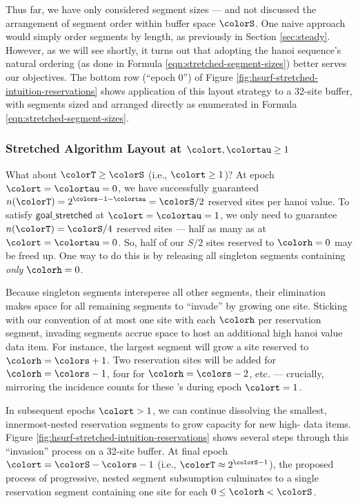 Thus far, we have only considered segment sizes --- and not discussed the arrangement of segment order within buffer space $\colorS$.
One naive approach would simply order segments by length, as previously in Section \ref{sec:steady}.
However, as we will see shortly, it turns out that adopting the hanoi sequence's natural ordering (as done in Formula \ref{eqn:stretched-segment-sizes}) better serves our objectives.
The bottom row (``epoch 0'') of Figure \ref{fig:hsurf-stretched-intuition-reservations} shows application of this layout strategy to a 32-site buffer, with segments sized and arranged directly as enumerated in Formula \ref{eqn:stretched-segment-sizes}.

\subsubsection{Stretched Algorithm Layout at $\colort,\colortau\geq1$}

What about $\colorT \geq \colorS$ (i.e., $\colort \geq 1$)?
At epoch $\colort=\colortau=0$, we have successfully guaranteed $n(\colorT) = 2^{\colors - 1 - \colortau} = \colorS / 2$ reserved sites per hanoi value.
To satisfy $\mathsf{goal\_stretched}$ at $\colort=\colortau=1$, we only need to guarantee $n(\colorT) = \colorS/4$ reserved sites --- half as many as at $\colort=\colortau=0$.
So, half of our $S/2$ sites reserved to \hv{} $\colorh=0$ may be freed up.
One way to do this is by releasing all singleton segments containing \textit{only} \hv{} $\colorh=0$.

Because singleton segments intersperse all other segments, their elimination makes space for all remaining segments to ``invade'' by growing one site.
Sticking with our convention of at most one site with each \hv{} $\colorh$ per reservation segment, invading segments accrue space to host an additional high hanoi value data item.
For instance, the largest segment will grow a site reserved to \hv{} $\colorh=\colors +1$.
Two reservation sites will be added for \hv{} $\colorh=\colors - 1$, four for \hv{} $\colorh=\colors - 2$, etc. --- crucially, mirroring the incidence counts for these \hv{}'s during epoch $\colort=1$.

In subsequent epochs $\colort>1$, we can continue dissolving the smallest, innermost-nested reservation segments to grow capacity for new high-\hv{} data items.
Figure \ref{fig:hsurf-stretched-intuition-reservations} shows several steps through this ``invasion'' process on a 32-site buffer.
At final epoch $\colort=\colorS-\colors - 1$ (i.e., $\colorT \approx 2^{\colorS - 1}$), the proposed process of progressive, nested segment subsumption culminates to a single reservation segment containing one site for each \hv{} $0 \leq \colorh < \colorS$.

